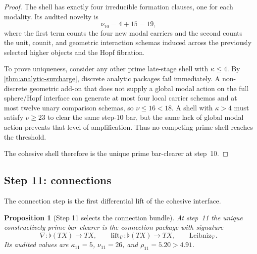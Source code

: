 \documentclass[11pt]{article}
\theoremstyle{plain}
\newtheorem{proposition}[theorem]{Proposition}
\theoremstyle{definition}
\theoremstyle{remark}
\begin{document}
\begin{proof}
The shell has exactly four irreducible formation clauses, one for each modality. Its audited novelty is
\[
  \nu_{10}=4+15=19,
\]
where the first term counts the four new modal carriers and the second counts the unit, counit, and geometric interaction schemas induced across the previously selected higher objects and the Hopf fibration.

To prove uniqueness, consider any other prime late-stage shell with $\kappa\le 4$. By \cref{thm:analytic-surcharge}, discrete analytic packages fail immediately. A non-discrete geometric add-on that does not supply a global modal action on the full sphere/Hopf interface can generate at most four local carrier schemas and at most twelve unary comparison schemas, so $\nu\le16<18$. A shell with $\kappa>4$ must satisfy $\nu\ge 23$ to clear the same step-10 bar, but the same lack of global modal action prevents that level of amplification. Thus no competing prime shell reaches the threshold.

The cohesive shell therefore is the unique prime bar-clearer at step~10.
\end{proof}

\subsection{Step 11: connections}

The connection step is the first differential lift of the cohesive interface.

\begin{proposition}[Step 11 selects the connection bundle]
\label{prop:step11}
At step~11 the unique constructively prime bar-clearer is the connection package with signature
\[
  \nabla:\flat(TX)\to TX,
  \qquad
  \mathrm{lift}_\nabla:\flat(TX)\to TX,
  \qquad
  \mathrm{Leibniz}_\nabla.
\]
Its audited values are $\kappa_{11}=5$, $\nu_{11}=26$, and $\rho_{11}=5.20>4.91$.
\end{proposition}
\end{document}
